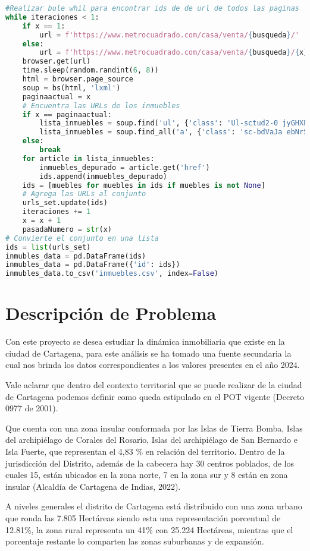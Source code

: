 \documentclass[12pt,a4paper]{article}
\begin{document}
\begin{lstlisting}[language=Python, caption={Almacenar las URL`s de las viviendas}, label={lst:ExtraLib3}]
#Realizar bule whil para encontrar ids de de url de todos las paginas
while iteraciones < 1:
	if x == 1:
		url = f'https://www.metrocuadrado.com/casa/venta/{busqueda}/'
	else:
		url = f'https://www.metrocuadrado.com/casa/venta/{busqueda}/{x}'
	browser.get(url)
	time.sleep(random.randint(6, 8))
	html = browser.page_source	
	soup = bs(html, 'lxml')	
	paginaactual = x	
	# Encuentra las URLs de los inmuebles
	if x == paginaactual:
		lista_inmuebles = soup.find('ul', {'class': 'Ul-sctud2-0 jyGHXP realestate-results-list browse-results-list'}).find_all('li')
		lista_inmuebles = soup.find_all('a', {'class': 'sc-bdVaJa ebNrSm'})	
	else:
		break	
	for article in lista_inmuebles:
		inmuebles_depurado = article.get('href')
		ids.append(inmuebles_depurado)	
	ids = [muebles for muebles in ids if muebles is not None]	
	# Agrega las URLs al conjunto
	urls_set.update(ids)	
	iteraciones += 1
	x = x + 1
	pasadaNumero = str(x)	
# Convierte el conjunto en una lista
ids = list(urls_set)
inmubles_data = pd.DataFrame(ids)
inmubles_data = pd.DataFrame({'id': ids})
inmubles_data.to_csv('inmuebles.csv', index=False)
\end{lstlisting}


 

\section{Descripción de Problema}
Con este proyecto se desea estudiar la dinámica inmobiliaria que existe en la ciudad de Cartagena, para este análisis se ha tomado una fuente secundaria la cual nos brinda los datos correspondientes a los valores presentes en el año 2024.

Vale aclarar que dentro del contexto territorial que se puede realizar de la ciudad de Cartagena podemos definir como queda estipulado en el POT vigente (Decreto 0977 de 2001).

Que cuenta con una zona insular conformada por las Islas de Tierra Bomba, Islas del archipiélago de Corales del Rosario, Islas del archipiélago de San Bernardo e Isla Fuerte, que representan el 4,83 \% en relación del territorio. Dentro de la jurisdicción del Distrito, además de la cabecera hay 30 centros poblados, de los cuales 15, están ubicados en la zona norte, 7 en la zona sur y 8 están en zona insular (Alcaldía de Cartagena de Indias, 2022).

A niveles generales el distrito de Cartagena está distribuido con una zona urbano que ronda las 7.805 Hectáreas siendo esta una representación porcentual de 12.81\%, la zona rural representa un 41\% con 25.224 Hectáreas, mientras que el porcentaje restante lo comparten las zonas suburbanas y de expansión.
\end{document}

